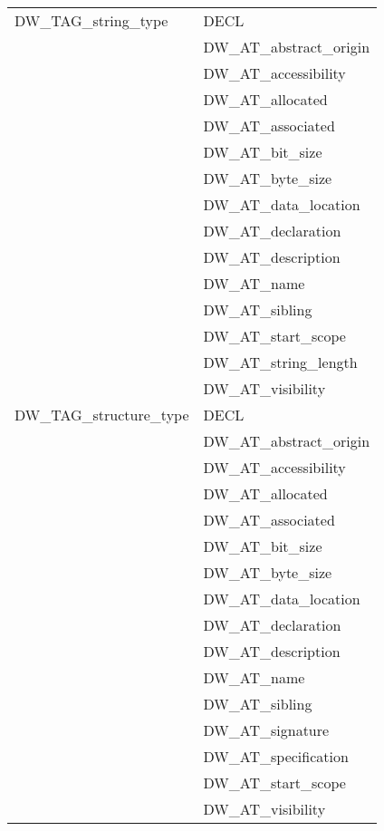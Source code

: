 \begin{longtable}{l|p{8cm}}
DW\_TAG\_string\_type
&DECL  \\
&DW\_AT\_abstract\_origin  \\
&DW\_AT\_accessibility  \\
&DW\_AT\_allocated  \\
&DW\_AT\_associated  \\
&DW\_AT\_bit\_size  \\
&DW\_AT\_byte\_size  \\
&DW\_AT\_data\_location  \\
&DW\_AT\_declaration  \\
&DW\_AT\_description  \\
&DW\_AT\_name  \\
&DW\_AT\_sibling  \\
&DW\_AT\_start\_scope  \\
&DW\_AT\_string\_length  \\
&DW\_AT\_visibility  \\

DW\_TAG\_structure\_type
&DECL  \\
&DW\_AT\_abstract\_origin  \\
&DW\_AT\_accessibility  \\
&DW\_AT\_allocated  \\
&DW\_AT\_associated  \\
&DW\_AT\_bit\_size  \\
&DW\_AT\_byte\_size  \\
&DW\_AT\_data\_location  \\
&DW\_AT\_declaration  \\
&DW\_AT\_description  \\
&DW\_AT\_name  \\
&DW\_AT\_sibling  \\
&DW\_AT\_signature  \\
&DW\_AT\_specification  \\
&DW\_AT\_start\_scope  \\
&DW\_AT\_visibility  \\


\end{longtable}

